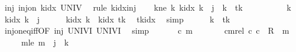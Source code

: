 \begin{isabellebody}
\ inj{\isacharcolon}{\kern0pt}\ {\isachardoublequoteopen}inj{\isacharunderscore}{\kern0pt}on\ k{\isacharunderscore}{\kern0pt}idx\ UNIV{\isachardoublequoteclose}\ \isamarkupfalse%
\ {\isacharparenleft}{\kern0pt}rule\ k{\isacharunderscore}{\kern0pt}idx{\isacharunderscore}{\kern0pt}inj{\isacharparenright}{\kern0pt}\isanewline
\ \ \isamarkupfalse%
\ kne{\isacharcolon}{\kern0pt}\ {\isachardoublequoteopen}{\isasymAnd}k{\isachardot}{\kern0pt}\ k{\isacharunderscore}{\kern0pt}idx\ k\ {\isacharequal}{\kern0pt}\ j\ {\isasymLongrightarrow}\ k\ {\isacharequal}{\kern0pt}\ {\isacharquery}{\kern0pt}tk{\isachardoublequoteclose}\isanewline
\ \ \isamarkupfalse%
\ {\isacharminus}{\kern0pt}\isanewline
\ \ \ \ \isamarkupfalse%
\ k\ \isamarkupfalse%
\ {\isachardoublequoteopen}k{\isacharunderscore}{\kern0pt}idx\ k\ {\isacharequal}{\kern0pt}\ j{\isachardoublequoteclose}\isanewline
\ \ \ \ \isamarkupfalse%
\ {\isachardoublequoteopen}k{\isacharunderscore}{\kern0pt}idx\ k\ {\isacharequal}{\kern0pt}\ k{\isacharunderscore}{\kern0pt}idx\ {\isacharquery}{\kern0pt}tk{\isachardoublequoteclose}\ \isamarkupfalse%
\ tkidx\ \isamarkupfalse%
\ simp\isanewline
\ \ \ \ \isamarkupfalse%
\ {\isachardoublequoteopen}k\ {\isacharequal}{\kern0pt}\ {\isacharquery}{\kern0pt}tk{\isachardoublequoteclose}\ \isamarkupfalse%
\ inj{\isacharunderscore}{\kern0pt}on{\isacharunderscore}{\kern0pt}eq{\isacharunderscore}{\kern0pt}iff{\isacharbrackleft}{\kern0pt}OF\ inj\ UNIV{\isacharunderscore}{\kern0pt}I\ UNIV{\isacharunderscore}{\kern0pt}I{\isacharbrackright}{\kern0pt}\ \isamarkupfalse%
\ simp\isanewline
\ \ \isamarkupfalse%
\isanewline
\ \ \isamarkupfalse%
\ c\ m\ \isanewline
\ \ \ \ \ \ cm{\isacharunderscore}{\kern0pt}rel{\isacharcolon}{\kern0pt}\ {\isachardoublequoteopen}{\isacharparenleft}{\kern0pt}c{}{\isacharcomma}{\kern0pt}\ c{\isacharparenright}{\kern0pt}\ {\isasymin}\ R{\isacharprime}{\kern0pt}\ {\isacharcircum}{\kern0pt}{\isacharcircum}{\kern0pt}\ m{\isachardoublequoteclose}\isanewline
\ \ \ \ \ m{\isacharunderscore}{\kern0pt}le{\isacharcolon}{\kern0pt}\ {\isachardoublequoteopen}m\ {\isasymle}\ j\ {\isacharasterisk}{\kern0pt}\ {\isacharparenleft}{\kern0pt}{\isacharquery}{\kern0pt}k\ {\isacharplus}{\kern0pt}\ {}{\isacharparenright}{\kern0pt}{\isachardoublequoteclose}\isanewline

\end{isabellebody}

